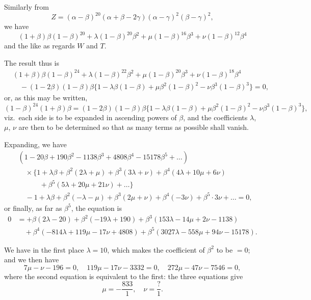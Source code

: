 \documentclass[11pt,a4paper]{article}
\theoremstyle{definition}
\begin{document}
Similarly from
\[
Z = (\alpha - \beta)^{20}(\alpha + \beta - 2\gamma)(\alpha - \gamma)^2(\beta - \gamma)^2,
\]
we have
\[
(1 + \beta)\beta(1 - \beta)^{20} + \lambda(1 - \beta)^{20}\beta^2 + \mu(1 - \beta)^{16}\beta^3 + \nu(1 - \beta)^{12}\beta^4
\]
and the like as regards $W$ and $T$.

The result thus is
\begin{align*}
&(1 + \beta)\beta(1 - \beta)^{24} + \lambda(1 - \beta)^{22}\beta^2 + \mu(1 - \beta)^{20}\beta^3 + \nu(1 - \beta)^{18}\beta^4\\
&\quad - (1 - 2\beta)(1 - \beta)\beta\{1 - \lambda\beta(1 - \beta) + \mu\beta^2(1 - \beta)^2 - \nu\beta^3(1 - \beta)^3\} = 0,
\end{align*}
or, as this may be written,
\[
(1 - \beta)^{24}(1 + \beta)\beta = (1 - 2\beta)(1 - \beta)\beta\{1 - \lambda\beta(1 - \beta) + \mu\beta^2(1 - \beta)^2 - \nu\beta^3(1 - \beta)^3\},
\]
viz.\ each side is to be expanded in ascending powers of $\beta$, and the coefficients $\lambda$, $\mu$, $\nu$ are then to be determined so that as many terms as possible shall vanish.

Expanding, we have
\begin{align*}
&(1 - 20\beta + 190\beta^2 - 1138\beta^3 + 4808\beta^4 - 15178\beta^5 + \ldots)\\
&\quad \times \{1 + \lambda\beta + \beta^2(2\lambda + \mu) + \beta^3(3\lambda + \nu) + \beta^4(4\lambda + 10\mu + 6\nu)\\
&\qquad\quad + \beta^5(5\lambda + 20\mu + 21\nu) + \ldots\}\\
&\quad - 1 + \lambda\beta + \beta^2(-\lambda - \mu) + \beta^3(2\mu + \nu) + \beta^4(-3\nu) + \beta^5 \cdot 3\nu + \ldots = 0,
\end{align*}
or finally, as far as $\beta^5$, the equation is
\begin{align*}
0 &= +\beta(2\lambda - 20) + \beta^2(-19\lambda + 190) + \beta^3(153\lambda - 14\mu + 2\nu - 1138)\\
&\quad + \beta^4(-814\lambda + 119\mu - 17\nu + 4808) + \beta^5(3027\lambda - 558\mu + 94\nu - 15178).
\end{align*}

We have in the first place $\lambda = 10$, which makes the coefficient of $\beta^2$ to be $= 0$; and we then have
\[
7\mu - \nu - 196 = 0, \quad 119\mu - 17\nu - 3332 = 0, \quad 272\mu - 47\nu - 7546 = 0,
\]
where the second equation is equivalent to the first: the three equations give
\[
\mu = -\frac{833}{1}, \quad \nu = \frac{?}{1}.
\]
\end{document}
